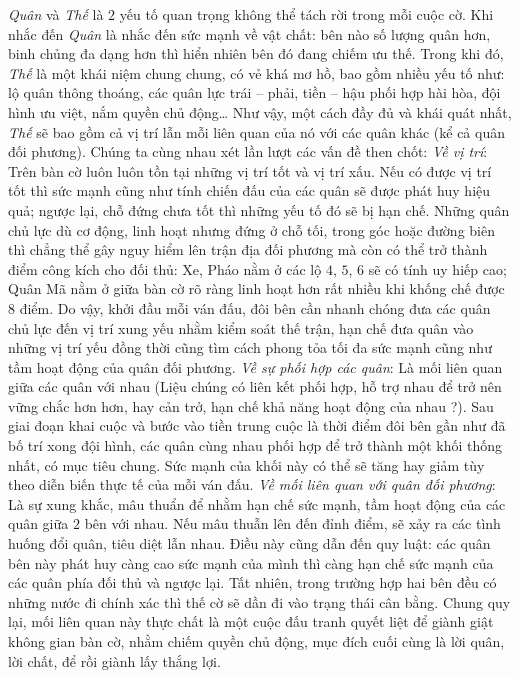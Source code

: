 \begin{multicols}{2}
	\textit{Quân} và \textit{Thế} là $2$ yếu tố quan trọng không thể tách rời trong mỗi cuộc cờ. Khi nhắc đến \textit{Quân} là nhắc đến sức mạnh về vật chất: bên nào số lượng quân hơn, binh chủng đa dạng hơn thì hiển nhiên bên đó đang chiếm ưu thế. Trong khi đó, \textit{Thế} là một khái niệm chung chung, có vẻ khá mơ hồ, bao gồm nhiều yếu tố như: lộ quân thông thoáng, các quân lực trái -- phải, tiền -- hậu phối hợp hài hòa, đội hình ưu việt, nắm quyền chủ động… Như vậy, một cách đầy đủ và khái quát nhất, \textit{Thế} sẽ bao gồm cả vị trí lẫn mỗi liên quan của nó với các quân khác (kể cả quân đối phương). Chúng ta cùng nhau xét lần lượt các vấn đề then chốt:
	\vskip 0.1cm
	\textit{Về vị trí}: Trên bàn cờ luôn luôn tồn tại những vị trí tốt và vị trí xấu. Nếu có được vị trí tốt thì sức mạnh cũng như tính chiến đấu của các quân sẽ được phát huy hiệu quả; ngược lại, chỗ đứng chưa tốt thì những yếu tố đó sẽ bị hạn chế. Những quân chủ lực dù cơ động, linh hoạt nhưng đứng ở chỗ tối, trong góc hoặc đường biên thì chẳng thể gây nguy hiểm lên trận địa đối phương mà còn có thể trở thành điểm công kích cho đối thủ: Xe, Pháo nằm ở các lộ $4$, $5$, $6$ sẽ có tính uy hiếp cao;  Quân Mã nằm ở giữa bàn cờ rõ ràng linh hoạt hơn rất nhiều khi khống chế được 8 điểm. Do vậy, khởi đầu mỗi ván đấu, đôi bên cần nhanh chóng đưa các quân chủ lực đến vị trí xung yếu nhằm kiểm soát thế trận, hạn chế đưa quân vào những vị trí yếu đồng thời cũng tìm cách phong tỏa tối đa sức mạnh cũng như tầm hoạt động của quân đối phương.
	\vskip 0.1cm
	\textit{Về sự phối hợp các quân}: Là mối liên quan giữa các quân với nhau (Liệu chúng có liên kết phối hợp, hỗ trợ nhau để trở nên vững chắc hơn hơn, hay cản trở, hạn chế khả năng hoạt động của nhau ?). Sau giai đoạn khai cuộc và bước vào tiền trung cuộc là thời điểm đôi bên gần như đã bố trí xong đội hình, các quân cùng nhau phối hợp để trở thành một khối thống nhất, có mục tiêu chung. Sức mạnh của khối này có thể sẽ tăng hay giảm tùy theo diễn biến thực tế của mỗi ván đấu.
	\vskip 0.1cm
	\textit{Về mối liên quan với quân đối phương}: Là sự xung khắc, mâu thuẩn để nhằm hạn chế sức mạnh, tầm hoạt động của các quân giữa $2$ bên với nhau. Nếu mâu thuẫn lên đến đỉnh điểm, sẽ xảy ra các tình huống đổi quân, tiêu diệt lẫn nhau. Điều này cũng dẫn đến quy luật: các quân bên này phát huy càng cao sức mạnh của mình thì càng hạn chế sức mạnh của các quân phía đối thủ và ngược lại. Tất nhiên, trong trường hợp hai bên đều có những nước đi chính xác thì thế cờ sẽ dần đi vào trạng thái cân bằng. Chung quy lại, mối liên quan này thực chất là một cuộc đấu tranh quyết liệt để giành giật không gian bàn cờ, nhằm chiếm quyền chủ động, mục đích cuối cùng là lời quân, lời chất, để rồi giành lấy thắng lợi.

\end{multicols}
